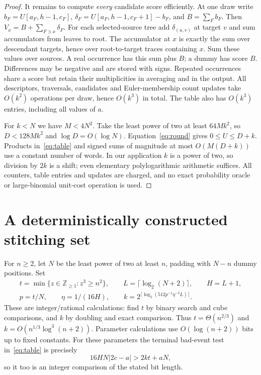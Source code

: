 \documentclass[acmsmall,11pt,nonacm,natbib=false]{acmart}
\begin{document}
\begin{proof}
It remains to compute \emph{every} candidate score efficiently. At one draw
write $b_F=U[a_F,h-1,c_F]$,
$\delta_F=U[a_F,h-1,c_F+1]-b_F$, and $B=\sum_F b_F$.
Then $V_x=B+\sum_{F\ni x}\delta_F$. For each selected-source tree add
$\delta_{(u,v)}$ at target $v$ and sum accumulators from leaves to root.
The accumulator at $x$ is exactly the sum over descendant targets, hence
over root-to-target traces containing $x$. Sum these values over sources.
A real occurrence has this sum plus $B$; a dummy has score $B$. Differences
may be negative and are stored with signs. Repeated occurrences share a
score but retain their multiplicities in averaging and in the output.
All descriptors, traversals, candidates and Euler-membership count updates
take $O(k^2)$ operations per draw, hence $O(k^3)$ in total. The table also
has $O(k^3)$ entries, including all values of $a$.

For $k<N$ we have $M<4N^2$. Take the least power of two at least $64Mk^2$,
so $D<128Mk^2$ and $\log D=O(\log N)$. Equation~\eqref{eq:round} gives
$0\leq U\leq D+k$. Products in~\eqref{eq:table} and signed sums of
magnitude at most $O(M(D+k))$ use a constant number of words. In our
application $k$ is a power of two, so division by $2k$ is a shift; even
elementary polylogarithmic arithmetic suffices. All counters, table entries
and updates are charged, and no exact probability oracle or large-binomial
unit-cost operation is used.
\end{proof}

\section{A deterministically constructed stitching set}
For $n\geq2$, let $N$ be the least power of two at least $n$, padding with
$N-n$ dummy positions. Set
\begin{equation}\label{eq:parameters}
 \begin{gathered}
 t=\min\{z\in\mathbb Z_{\geq1}:z^3\geq n^2\},\qquad
 L=\lceil\log_2(N+2)\rceil,\qquad H=L+1,\\
 p=t/N,\qquad \eta=1/(16H),\qquad
 k=2^{\lceil\log_2(512p^{-1}\eta^{-2}L)\rceil}.
 \end{gathered}
\end{equation}
These are integer/rational calculations: find $t$ by binary search and cube
comparisons, and $k$ by doubling and exact comparison. Thus
$t=\Theta(n^{2/3})$ and $k=O(n^{1/3}\log^3(n+2))$. Parameter calculations
use $O(\log(n+2))$ bits up to fixed constants. For these parameters the
terminal bad-event test in~\eqref{eq:table} is precisely
\[
 16HN|2c-a|>2kt+aN,
\]
so it too is an integer comparison of the stated bit length.
\end{document}
